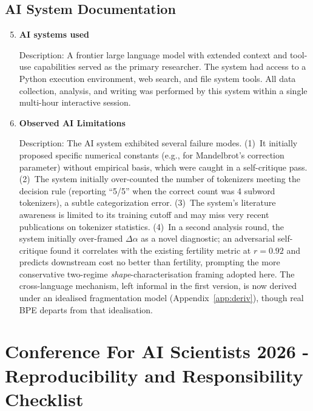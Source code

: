 \documentclass{article}
\begin{document}
\subsection*{AI System Documentation}

\begin{enumerate}
  \setcounter{enumi}{4}

  \item \textbf{AI systems used}

    Description: A frontier large language model with extended context and tool-use
    capabilities served as the primary researcher. The system had access to a Python
    execution environment, web search, and file system tools. All data collection,
    analysis, and writing was performed by this system within a single multi-hour
    interactive session.

  \item \textbf{Observed AI Limitations}

    Description: The AI system exhibited several failure modes. (1)~It initially
    proposed specific numerical constants (e.g., for Mandelbrot's correction parameter)
    without empirical basis, which were caught in a self-critique pass. (2)~The system
    initially over-counted the number of tokenizers meeting the decision rule (reporting
    ``5/5'' when the correct count was 4 subword tokenizers), a subtle categorization
    error. (3)~The system's literature awareness is limited to its training cutoff and
    may miss very recent publications on tokenizer statistics. (4)~In a second analysis
    round, the system initially over-framed $\Delta\alpha$ as a novel diagnostic; an
    adversarial self-critique found it correlates with the existing fertility metric at
    $r = 0.92$ and predicts downstream cost no better than fertility, prompting the more
    conservative two-regime \emph{shape}-characterisation framing adopted here. The
    cross-language mechanism, left informal in the first version, is now derived under an
    idealised fragmentation model (Appendix~\ref{app:deriv}), though real BPE departs from
    that idealisation.

\end{enumerate}

\newpage

\section*{Conference For AI Scientists 2026 - Reproducibility and Responsibility Checklist}
\label{checklist_reproducibility}
\end{document}
